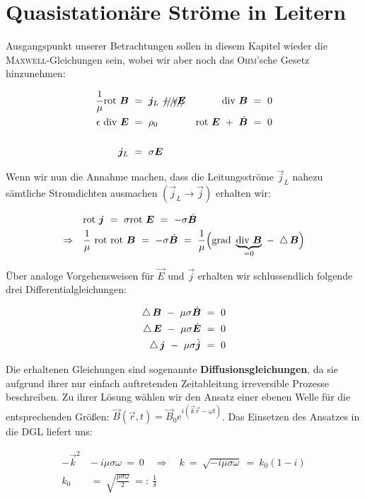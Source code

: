 \section{Quasistationäre Ströme in Leitern}

Ausgangspunkt unserer Betrachtungen sollen in diesem Kapitel wieder die \textsc{Maxwell}-Gleichungen sein, wobei wir aber noch das \textsc{Ohm}'sche Gesetz hinzunehmen:

\begin{align*}
\frac{1}{\mu}\rot\vec{B}  \ &= \ \vec{j}_L \ \xout{+ \ \epsilon\vec{E}}  & \div\vec{B}  \ &= \ 0\\
\epsilon \ \div\vec{E} \ &= \ \rho_0  & \rot\vec{E} \ + \ \dot{\vec{B}} \ &= \ 0\\
\ \\
\vec{j}_L \ &= \ \sigma \vec{E}
\end{align*}

Wenn wir nun die Annahme machen, dass die Leitungsströme $\vec{j}_L$ nahezu sämtliche Stromdichten ausmachen $(\vec{j}_L\rightarrow\vec{j})$ erhalten wir:

\begin{align*}
&\rot \vec{j} \ = \ \sigma \rot\vec{E}  \ = \ -\sigma\dot{\vec{B}}\\
\Rightarrow \quad &\frac{1}{\mu} \ \rot\rot \vec{B} \ = \ -\sigma \dot{\vec{B}}  \ = \ \frac{1}{\mu}\Big(\grad\underbrace{\div\vec{B}}_{=0} \ - \ \laplace\vec{B}\Big)
\end{align*}

Über analoge Vorgehensweisen für $\vec{E}$ und $\vec{j}$ erhalten wir schlussendlich folgende drei Differentialgleichungen:

\begin{align*}
\mathop{{}\bigtriangleup}\nolimits \bm{B} \ - \ \mu\sigma\dot{\bm{B}} \ &= \ 0\\
\mathop{{}\bigtriangleup}\nolimits \bm{E} \ - \ \mu\sigma\dot{\bm{E}} \ &= \ 0\\
\mathop{{}\bigtriangleup}\nolimits \bm{j} \ - \ \mu\sigma\dot{\bm{j}} \ &= \ 0
\end{align*}

Die erhaltenen Gleichungen sind sogenannte \textbf{Diffusionsgleichungen}, da sie aufgrund ihrer nur einfach auftretenden Zeitableitung irreversible Prozesse beschreiben. Zu ihrer Lösung wählen wir den Ansatz einer ebenen Welle für die entsprechenden Größen: $\vec{B}(\vec{r},t)= \vec{B}_0 e^{i(\vec{k}\vec{r}-\omega t)}$. Das Einsetzen des Ansatzes in die DGL liefert uns:

\begin{align*}
-\vec{k}^2 \ &- \ i\mu\sigma\omega  \ = \ 0 \quad \Rightarrow \quad k  \ = \ \sqrt{-i\mu\sigma\omega} \ = \ k_0(1-i)\\
k_0  \ &= \ \sqrt{\frac{\mu\sigma\omega}{2}} \ =: \ \frac{1}{\delta}
\end{align*}

